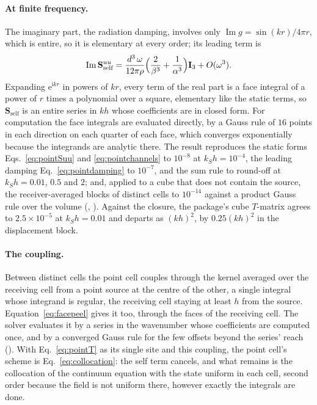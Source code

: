 \documentclass[11pt,a4paper]{article}
\newcommand{\bI}{\mathbf{I}}
\newcommand{\bS}{\mathbf{S}}
\begin{document}
\paragraph{At finite frequency.} The imaginary part, the radiation damping, involves only
$\operatorname{Im}g=\sin(kr)/4\pi r$, which is entire, so it is elementary at every order; its leading term
is
\begin{equation}\label{eq:pointdamping}
  \operatorname{Im}\bS^{uu}_{\text{self}}=\frac{d^3\,\omega}{12\pi\rho}\Bigl(\frac{2}{\beta^3}+\frac{1}{\alpha^3}\Bigr)\bI_3+O(\omega^3).
\end{equation}
Expanding $\mathrm{e}^{\mathrm{i}kr}$ in powers of $kr$, every term of the real part is a face integral of
a power of $r$ times a polynomial over a square, elementary like the static terms, so $\bS_{\text{self}}$ is
an entire series in $kh$ whose coefficients are in closed form. For computation the face integrals are
evaluated directly, by a Gauss rule of $16$ points in each direction on each quarter of each face, which
converges exponentially because the integrands are analytic there. The result reproduces the static forms
Eqs.~\eqref{eq:pointSuu} and \eqref{eq:pointchannels} to $10^{-8}$ at $k_Sh=10^{-4}$, the leading damping
Eq.~\eqref{eq:pointdamping} to $10^{-7}$, and the sum rule to round-off at $k_Sh=0.01$, $0.5$ and $2$; and,
applied to a cube that does not contain the source, the receiver-averaged blocks of distinct cells to
$10^{-14}$ against a product Gauss rule over the volume (,
). Against the closure, the package's cube $T$-matrix
agrees to $2.5\times10^{-5}$ at $k_Sh=0.01$ and departs as $(kh)^2$, by $0.25(kh)^2$ in the
displacement block.

\paragraph{The coupling.} Between distinct cells the point cell couples through the kernel averaged over
the receiving cell from a point source at the centre of the other, a single integral whose integrand is
regular, the receiving cell staying at least $h$ from the source. Equation~\eqref{eq:facepeel} gives it
too, through the faces of the receiving cell. The solver evaluates it by a series in the wavenumber whose
coefficients are computed once, and by a converged Gauss rule for the few offsets beyond the series'
reach (). With Eq.~\eqref{eq:pointT} as its single site and
this coupling, the point cell's scheme is Eq.~\eqref{eq:collocation}: the self term cancels, and what
remains is the collocation of the continuum equation with the state uniform in each cell, second order
because the field is not uniform there, however exactly the integrals are done.
\end{document}
